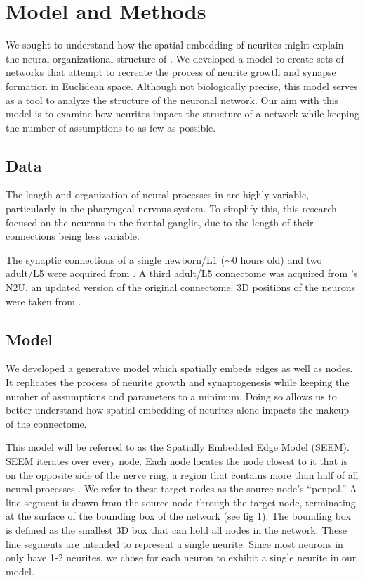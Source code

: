 \section{Model and Methods}

We sought to understand how the spatial embedding of neurites might explain the neural organizational structure of \ce. 
We developed a model to create sets of networks that attempt to recreate the process of neurite growth and synapse formation in Euclidean space. 
Although not biologically precise, this model serves as a tool to analyze the structure of the \ce neuronal network.
Our aim with this model is to examine how neurites impact the structure of a network while keeping the number of assumptions to as few as possible.

\subsection{Data}
The length and organization of neural processes in \ce are highly variable, particularly in the pharyngeal nervous system. 
To simplify this, this research focused on the neurons in the frontal ganglia, due to the length of their connections being less variable. 

The synaptic connections of a single newborn/L1 ($\sim 0$ hours old) and two adult/L5 \ce were acquired from \cite{Witvliet}.
A third adult/L5 connectome was acquired from \cite{Durbin}'s N2U, an updated version of the original \cite{White} connectome. 
3D positions of the neurons were taken from \cite{Skuhersky}. 

\subsection{Model}
We developed a generative model which spatially embeds edges as well as nodes. 
It replicates the process of neurite growth and synaptogenesis while keeping the number of assumptions and parameters to a minimum. 
Doing so allows us to better understand how spatial embedding of neurites alone impacts the makeup of the connectome.

This model will be referred to as the Spatially Embedded Edge Model (SEEM). 
SEEM iterates over every node. 
Each node locates the node closest to it that is on the opposite side of the nerve ring, a region that contains more than half of all neural processes \citep{Altun}. 
We refer to these target nodes as the source node's ``penpal.''
A line segment is drawn from the source node through the target node, terminating at the surface of the bounding box of the network (see fig 1). 
The bounding box is defined as the smallest 3D box that can hold all nodes in the network. 
These line segments are intended to represent a single neurite. 
Since most neurons in \ce only have 1-2 neurites, we chose for each neuron to exhibit a single neurite in our model.

